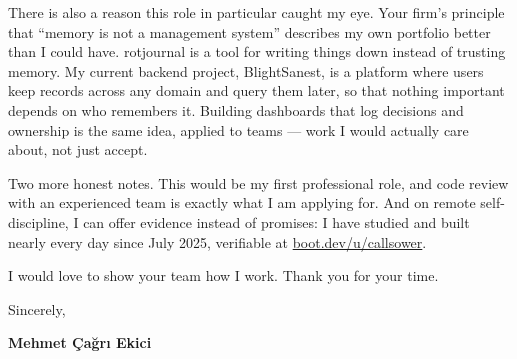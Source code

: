 \documentclass[11pt,a4paper]{article}
\begin{document}
There is also a reason this role in particular caught my eye. Your firm's principle that ``memory is not a management system'' describes my own portfolio better than I could have. rotjournal is a tool for writing things down instead of trusting memory. My current backend project, BlightSanest, is a platform where users keep records across any domain and query them later, so that nothing important depends on who remembers it. Building dashboards that log decisions and ownership is the same idea, applied to teams --- work I would actually care about, not just accept.

Two more honest notes. This would be my first professional role, and code review with an experienced team is exactly what I am applying for. And on remote self-discipline, I can offer evidence instead of promises: I have studied and built nearly every day since July 2025, verifiable at \href{https://www.boot.dev/u/callsower}{boot.dev/u/callsower}.

I would love to show your team how I work. Thank you for your time.

Sincerely,

\textbf{Mehmet Çağrı Ekici}
\end{document}
